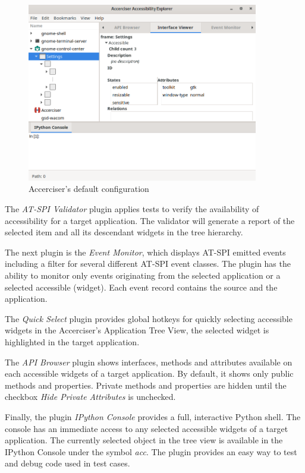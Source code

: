 \begin{figure}[hbt]
	\centering
	\includegraphics[width=0.9\textwidth]{obrazky-figures/accerciser.png}
	\caption{Accerciser's default configuration}
	\label{Accerciser_img}
\end{figure}

The \textit{AT-SPI Validator} plugin applies tests to verify the availability of accessibility for a target application. The validator will generate a report of the selected item and all its descendant widgets in the tree hierarchy.

The next plugin is the \textit{Event Monitor}, which displays AT-SPI emitted events including a filter for several different AT-SPI event classes. The plugin has the ability to monitor only events originating from the selected application or a selected accessible (widget). Each event record contains the source and the application.

The \textit{Quick Select} plugin provides global hotkeys for quickly selecting accessible widgets in the Accerciser's Application Tree View, the selected widget is highlighted in the target application.

The \textit{API Browser} plugin shows interfaces, methods and attributes available on each accessible widgets of a target application. By default, it shows only public methods and properties. Private methods and properties are hidden until the checkbox \textit{Hide Private Attributes} is unchecked.
 
Finally, the plugin \textit{IPython Console} provides a full, interactive Python shell. The console has an immediate access to any selected accessible widgets of a target application. The currently selected object in the tree view is available in the IPython Console under the symbol \textit{acc}. The plugin provides an easy way to test and debug code used in test cases.

